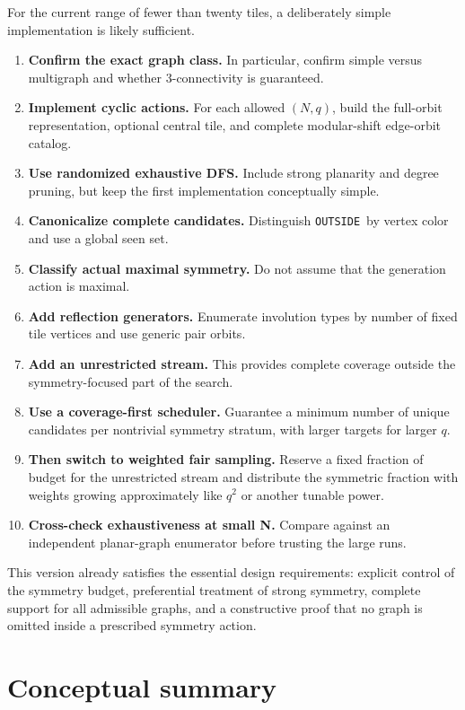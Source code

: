 \documentclass[11pt]{article}
\newcommand{\OUT}{\texttt{OUTSIDE}}
\begin{document}
For the current range of fewer than twenty tiles, a deliberately simple implementation is likely sufficient.

\begin{enumerate}
  \item \textbf{Confirm the exact graph class.} In particular, confirm simple versus multigraph and whether 3-connectivity is guaranteed.
  \item \textbf{Implement cyclic actions.} For each allowed \((N,q)\), build the full-orbit representation, optional central tile, and complete modular-shift edge-orbit catalog.
  \item \textbf{Use randomized exhaustive DFS.} Include strong planarity and degree pruning, but keep the first implementation conceptually simple.
  \item \textbf{Canonicalize complete candidates.} Distinguish \OUT\ by vertex color and use a global seen set.
  \item \textbf{Classify actual maximal symmetry.} Do not assume that the generation action is maximal.
  \item \textbf{Add reflection generators.} Enumerate involution types by number of fixed tile vertices and use generic pair orbits.
  \item \textbf{Add an unrestricted stream.} This provides complete coverage outside the symmetry-focused part of the search.
  \item \textbf{Use a coverage-first scheduler.} Guarantee a minimum number of unique candidates per nontrivial symmetry stratum, with larger targets for larger \(q\).
  \item \textbf{Then switch to weighted fair sampling.} Reserve a fixed fraction of budget for the unrestricted stream and distribute the symmetric fraction with weights growing approximately like \(q^2\) or another tunable power.
  \item \textbf{Cross-check exhaustiveness at small N.} Compare against an independent planar-graph enumerator before trusting the large runs.
\end{enumerate}

This version already satisfies the essential design requirements: explicit control of the symmetry budget, preferential treatment of strong symmetry, complete support for all admissible graphs, and a constructive proof that no graph is omitted inside a prescribed symmetry action.

\section{Conceptual summary}
\end{document}
